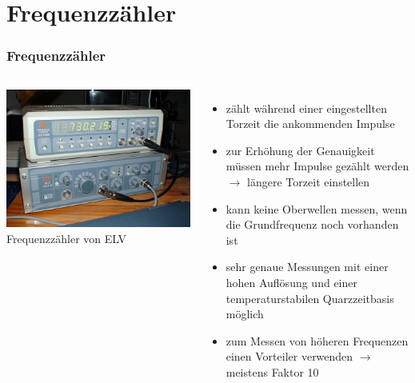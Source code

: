 \section*{Frequenzzähler}

\begin{frame}
  \frametitle{Frequenzzähler}
  \begin{columns}
    \begin{center}
      \includegraphics[width=\textwidth,height=.8\textheight,keepaspectratio]{a16/Frequenzzaehler.jpg}\\
      {\tiny Frequenzzähler von ELV \href{refs}{\cite{wmen}}}
    \end{center}
    \begin{itemize}
      \item zählt während einer eingestellten Torzeit die ankommenden Impulse
      \item zur Erhöhung der Genauigkeit müssen mehr Impulse gezählt werden $\rightarrow$ längere Torzeit einstellen
      \item kann keine Oberwellen messen, wenn die Grundfrequenz noch vorhanden ist
      \item sehr genaue Messungen mit einer hohen Auflösung und einer temperaturstabilen Quarzzeitbasis möglich
      \item zum Messen von höheren Frequenzen einen Vorteiler verwenden $\rightarrow$ meistens Faktor 10
    \end{itemize}
  \end{columns}
\end{frame}

